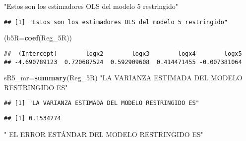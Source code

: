 \documentclass[
]{article}
\newenvironment{Shaded}{\begin{snugshade}}{\end{snugshade}}
\newcommand{\DataTypeTok}[1]{\textcolor[rgb]{0.13,0.29,0.53}{#1}}
\newcommand{\KeywordTok}[1]{\textcolor[rgb]{0.13,0.29,0.53}{\textbf{#1}}}
\newcommand{\NormalTok}[1]{#1}
\newcommand{\OperatorTok}[1]{\textcolor[rgb]{0.81,0.36,0.00}{\textbf{#1}}}
\newcommand{\StringTok}[1]{\textcolor[rgb]{0.31,0.60,0.02}{#1}}
\begin{document}
\begin{Shaded}
\begin{Highlighting}[]
\StringTok{"Estos son los estimadores OLS del modelo 5 restringido"}
\end{Highlighting}
\end{Shaded}

\begin{verbatim}
## [1] "Estos son los estimadores OLS del modelo 5 restringido"
\end{verbatim}

\begin{Shaded}
\begin{Highlighting}[]
\NormalTok{(}\DataTypeTok{b5R=}\KeywordTok{coef}\NormalTok{(Reg_5R))}
\end{Highlighting}
\end{Shaded}

\begin{verbatim}
##  (Intercept)        logx2        logx3        logx4        logx5 
## -4.690789123  0.720687524  0.592909608  0.414471455 -0.007381064
\end{verbatim}

\begin{Shaded}
\begin{Highlighting}[]
\NormalTok{sR5_mr=}\KeywordTok{summary}\NormalTok{(Reg_5R)}
\StringTok{"LA VARIANZA ESTIMADA DEL MODELO RESTRINGIDO ES"}
\end{Highlighting}
\end{Shaded}

\begin{verbatim}
## [1] "LA VARIANZA ESTIMADA DEL MODELO RESTRINGIDO ES"
\end{verbatim}

\begin{Shaded}
\end{Shaded}

\begin{verbatim}
## [1] 0.1534774
\end{verbatim}

\begin{Shaded}
\begin{Highlighting}[]
\StringTok{" EL ERROR ESTÁNDAR DEL MODELO RESTRINGIDO ES"}
\end{Highlighting}
\end{Shaded}
\end{document}
